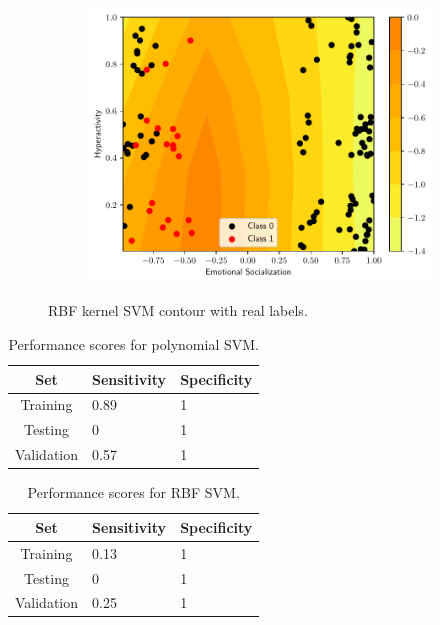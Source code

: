 \begin{figure}
\begin{subfigure}[b]{0.32\textwidth}
        \includegraphics[width=\textwidth]{figs/svm-rbf-contour-2-5.pdf}
        \caption{}
    \end{subfigure}
    \caption{RBF kernel SVM contour with real labels.}
    \label{fig:SVM-rbf}
\end{figure}

\begin{table}
\centering
\caption{Performance scores for polynomial SVM.}
\label{tab:poly_SVM}
\begin{tabular}{cll}
\hline
\textbf{Set} & \multicolumn{1}{c}{\textbf{Sensitivity}} & \multicolumn{1}{c}{\textbf{Specificity}} \\ \hline
Training & 0.89 & 1 \\
Testing & 0 & 1 \\
Validation & 0.57 & 1 \\ \hline
\end{tabular}
\end{table}

\begin{table}
\centering
\caption{Performance scores for RBF SVM.}
\label{tab:rbf_SVM}
\begin{tabular}{cll}
\hline
\textbf{Set} & \multicolumn{1}{c}{\textbf{Sensitivity}} & \multicolumn{1}{c}{\textbf{Specificity}} \\ \hline
Training & 0.13 & 1 \\
Testing & 0 & 1 \\
Validation & 0.25 & 1 \\ \hline
\end{tabular}
\end{table}
